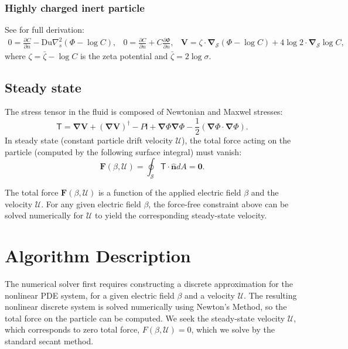 \documentclass[10pt]{ijnam}
\newcommand{\deriv}[2]{\frac{\partial #1}{\partial #2}}
\newcommand{\pars}[1]{\left(#1\right)}
\newcommand\bnabla{\boldsymbol{\nabla}}
\newcommand\bV{\boldsymbol{V}}
\newcommand\bF{\boldsymbol{F}}
\newcommand\bnhat{\hat{\boldsymbol{n}}}
\newcommand\bzero{\boldsymbol{0}}
\newcommand\cU{\mathscr{U}}
\newcommand\tI{\mathsf{I}}
\newcommand\tT{\mathsf{T}}
\begin{document}
\subsubsection{Highly charged inert particle}
See \cite{schnitzer2012surface} for full derivation:
\begin{equation} \label{eq:ephor_bnd}
\begin{array}{ccc}
0 = {\deriv{C}{n} - \text{Du} \nabla^2_s \pars{\varPhi - \log C}}, & 
0 = {\deriv{C}{n} + C \deriv{\varPhi}{n}}, &
\bV = \zeta \cdot \bnabla_\mathcal{S} \pars{\varPhi - \log C} +
4 \log 2 \cdot \bnabla_\mathcal{S} \log C,
\end{array}\end{equation}
where $\zeta = \bar{\zeta} - \log C$ 
is the zeta potential and $\bar{\zeta} = 2 \log \sigma$.

\subsection{Steady state}
The stress tensor in the fluid is composed of Newtonian and Maxwel stresses:
\begin{equation}
\label{eq:tensor}
\tT = \bnabla \bV + (\bnabla \bV)^\dagger - P \tI
+ \bnabla \varPhi \bnabla \varPhi - \frac{1}{2} (\bnabla \varPhi \cdot \bnabla \varPhi). 
\end{equation} 
In steady state (constant particle drift velocity $\cU$), the total force acting on the particle 
(computed by the following surface integral) must vanish:
\begin{equation} \label{eq:zero_force}
 \bF(\beta, \cU) = \oint_\mathcal{S} \tT \cdot \bnhat dA = \bzero.
\end{equation}

The total force $\bF(\beta, \cU)$ is a function of the applied electric field $\beta$ and
the velocity $\cU$.
For any given electric field $\beta$, the force-free constraint above 
can be solved numerically for $\cU$ to yield the corresponding steady-state velocity.

\section{Algorithm Description} \label{sec:algorithm}
The numerical solver first requires constructing a discrete 
approximation for the nonlinear PDE system,
for a given electric field $\beta$ and a velocity $\cU$. 
The resulting nonlinear discrete system is
solved numerically using Newton's Method, so the total force on the
particle can be computed. 
We seek the steady-state velocity $\cU$, 
which corresponds to zero total force, $F(\beta, \cU) = 0$,
which we solve by the standard secant method.
\end{document}

